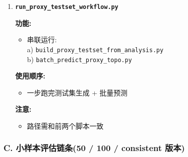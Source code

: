\documentclass[lang=cn,scheme=chinese,color=blue,device=normal,toc=onecol,math=cm]{elegantbook}
\begin{document}
\begin{enumerate}
\begin{itemize}
\item \texttt{INPUT\_\allowbreak{}TESTSET\_\allowbreak{}CSV}
\item \texttt{OUTPUT\_\allowbreak{}PRED\_\allowbreak{}CSV}
\end{itemize}
\item \textbf{\texttt{run\_\allowbreak{}proxy\_\allowbreak{}testset\_\allowbreak{}workflow.py}}\par
 
\textbf{功能:}\par
 
\begin{itemize}
\item 串联运行:\\ a) \texttt{build\_\allowbreak{}proxy\_\allowbreak{}testset\_\allowbreak{}from\_\allowbreak{}analysis.py}\\ b) \texttt{batch\_\allowbreak{}predict\_\allowbreak{}proxy\_\allowbreak{}topo.py}
\end{itemize}
 
\textbf{使用顺序:}\par
 
\begin{itemize}
\item 一步跑完测试集生成 + 批量预测
\end{itemize}
 
\textbf{注意:}\par
 
\begin{itemize}
\item 路径需和前两个脚本一致
\end{itemize}
\end{enumerate}


\subsubsection{C. 小样本评估链条(50 /\allowbreak{} 100 /\allowbreak{} consistent 版本)}
\end{document}
